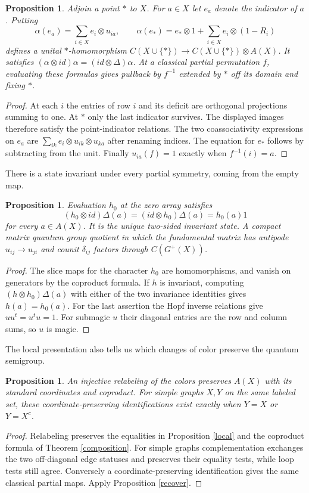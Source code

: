 \documentclass[11pt,a4paper]{article}
\newtheorem{prop}[thm]{Proposition}
\begin{document}
\begin{prop}\label{cemetery}
Adjoin a point $*$ to $X$. For $a\in X$ let $e_a$ denote the indicator of $a$. Putting
\[
 \alpha(e_a)=\sum_{i\in X}e_i\otimes u_{ia},\qquad
 \alpha(e_*)=e_*\otimes1+\sum_{i\in X}e_i\otimes(1-R_i)
\]
defines a unital $*$-homomorphism $C(X\cup\{*\})\to C(X\cup\{*\})\otimes A(X)$. It satisfies $(\alpha\otimes id)\alpha=(id\otimes\Delta)\alpha$. At a classical partial permutation $f$, evaluating these formulas gives pullback by $f^{-1}$ extended by $*$ off its domain and fixing $*$.
\end{prop}
\begin{proof}
At each $i$ the entries of row $i$ and its deficit are orthogonal projections summing to one. At $*$ only the last indicator survives. The displayed images therefore satisfy the point-indicator relations. The two coassociativity expressions on $e_a$ are $\sum_{ik}e_i\otimes u_{ik}\otimes u_{ka}$ after renaming indices. The equation for $e_*$ follows by subtracting from the unit. Finally $u_{ia}(f)=1$ exactly when $f^{-1}(i)=a$.
\end{proof}

There is a state invariant under every partial symmetry, coming from the empty map.

\begin{prop}
Evaluation $h_0$ at the zero array satisfies
\[
 (h_0\otimes id)\Delta(a)=(id\otimes h_0)\Delta(a)=h_0(a)1
\]
for every $a\in A(X)$. It is the unique two-sided invariant state. A compact matrix quantum group quotient in which the fundamental matrix has antipode $u_{ij}\to u_{ji}$ and counit $\delta_{ij}$ factors through $C(G^+(X))$.
\end{prop}
\begin{proof}
The slice maps for the character $h_0$ are homomorphisms, and vanish on generators by the coproduct formula. If $h$ is invariant, computing $(h\otimes h_0)\Delta(a)$ with either of the two invariance identities gives $h(a)=h_0(a)$. For the last assertion the Hopf inverse relations give $uu^t=u^tu=1$. For submagic $u$ their diagonal entries are the row and column sums, so $u$ is magic.
\end{proof}

The local presentation also tells us which changes of color preserve the quantum semigroup.

\begin{prop}
An injective relabeling of the colors preserves $A(X)$ with its standard coordinates and coproduct. For simple graphs $X,Y$ on the same labeled set, these coordinate-preserving identifications exist exactly when $Y=X$ or $Y=X^c$.
\end{prop}
\begin{proof}
Relabeling preserves the equalities in Proposition \ref{local} and the coproduct formula of Theorem \ref{composition}. For simple graphs complementation exchanges the two off-diagonal edge statuses and preserves their equality tests, while loop tests still agree. Conversely a coordinate-preserving identification gives the same classical partial maps. Apply Proposition \ref{recover}.
\end{proof}
\end{document}
